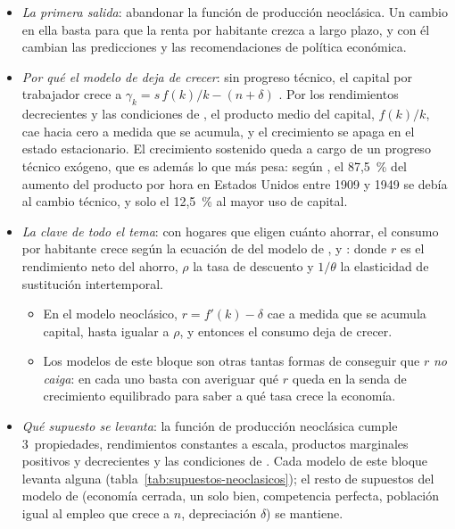 \documentclass[11pt]{article}
\begin{document}
\begin{itemize}
\item \emph{La primera salida}: abandonar la función de producción neoclásica. Un cambio en ella basta para que la renta por habitante crezca a largo plazo, y con él cambian las predicciones y las recomendaciones de política económica.
\item \emph{Por qué el modelo de  deja de crecer}: sin progreso técnico, el capital por trabajador crece a $\gamma_k=s\,f(k)/k-(n+\delta)$ . Por los rendimientos decrecientes y las condiciones de , el producto medio del capital, $f(k)/k$, cae hacia cero a medida que se acumula, y el crecimiento se apaga en el estado estacionario. El crecimiento sostenido queda a cargo de un progreso técnico exógeno, que es además lo que más pesa: según \textcite[p.~320]{Solow1957}, el 87,5~\% del aumento del producto por hora en Estados Unidos entre 1909 y 1949 se debía al cambio técnico, y solo el 12,5~\% al mayor uso de capital.
\item \emph{La clave de todo el tema}: con hogares que eligen cuánto ahorrar, el consumo por habitante crece según la ecuación de  del modelo de ,  y  :
  donde $r$ es el rendimiento neto del ahorro, $\rho$ la tasa de descuento y $1/\theta$ la elasticidad de sustitución intertemporal.
  \begin{itemize}
  \item En el modelo neoclásico, $r=f'(k)-\delta$ cae a medida que se acumula capital, hasta igualar a $\rho$, y entonces el consumo deja de crecer.
  \item Los modelos de este bloque son otras tantas formas de conseguir que $r$ \emph{no caiga}: en cada uno basta con averiguar qué $r$ queda en la senda de crecimiento equilibrado para saber a qué tasa crece la economía.
  \end{itemize}
\item \emph{Qué supuesto se levanta}: la función de producción neoclásica cumple 3~propiedades, rendimientos constantes a escala, productos marginales positivos y decrecientes y las condiciones de . Cada modelo de este bloque levanta alguna (tabla~\ref{tab:supuestos-neoclasicos}); el resto de supuestos del modelo de  (economía cerrada, un solo bien, competencia perfecta, población igual al empleo que crece a $n$, depreciación $\delta$) se mantiene.
\end{itemize}
\end{document}
